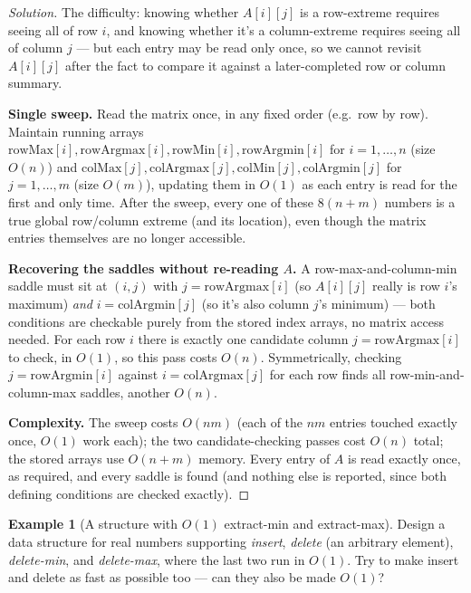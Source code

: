 \documentclass[11pt]{article}
\theoremstyle{definition}
\newtheorem{example}{Example}[section]
\begin{document}
\begin{proof}[Solution]
The difficulty: knowing whether $A[i][j]$ is a row-extreme requires seeing all of row $i$, and knowing whether it's a column-extreme requires seeing all of column $j$ — but each entry may be read only once, so we cannot revisit $A[i][j]$ after the fact to compare it against a later-completed row or column summary.

\textbf{Single sweep.} Read the matrix once, in any fixed order (e.g.\ row by row). Maintain running arrays $\mathrm{rowMax}[i],\mathrm{rowArgmax}[i],\mathrm{rowMin}[i],\mathrm{rowArgmin}[i]$ for $i=1,\dots,n$ (size $O(n)$) and $\mathrm{colMax}[j],\mathrm{colArgmax}[j],\mathrm{colMin}[j],\mathrm{colArgmin}[j]$ for $j=1,\dots,m$ (size $O(m)$), updating them in $O(1)$ as each entry is read for the first and only time. After the sweep, every one of these $8(n+m)$ numbers is a true global row/column extreme (and its location), even though the matrix entries themselves are no longer accessible.

\textbf{Recovering the saddles without re-reading $A$.} A row-max-and-column-min saddle must sit at $(i,j)$ with $j=\mathrm{rowArgmax}[i]$ (so $A[i][j]$ really is row $i$'s maximum) \emph{and} $i=\mathrm{colArgmin}[j]$ (so it's also column $j$'s minimum) — both conditions are checkable purely from the stored index arrays, no matrix access needed. For each row $i$ there is exactly one candidate column $j=\mathrm{rowArgmax}[i]$ to check, in $O(1)$, so this pass costs $O(n)$. Symmetrically, checking $j=\mathrm{rowArgmin}[i]$ against $i=\mathrm{colArgmax}[j]$ for each row finds all row-min-and-column-max saddles, another $O(n)$.

\textbf{Complexity.} The sweep costs $O(nm)$ (each of the $nm$ entries touched exactly once, $O(1)$ work each); the two candidate-checking passes cost $O(n)$ total; the stored arrays use $O(n+m)$ memory. Every entry of $A$ is read exactly once, as required, and every saddle is found (and nothing else is reported, since both defining conditions are checked exactly).
\end{proof}

\begin{example}[A structure with $O(1)$ extract-min and extract-max]
Design a data structure for real numbers supporting \emph{insert}, \emph{delete} (an arbitrary element), \emph{delete-min}, and \emph{delete-max}, where the last two run in $O(1)$. Try to make insert and delete as fast as possible too — can they also be made $O(1)$?
\end{example}
\end{document}
